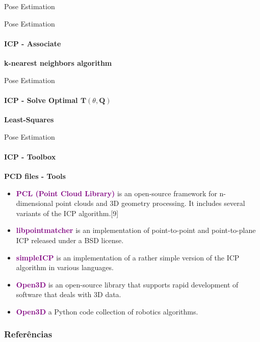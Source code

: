 \documentclass[aspectratio=169]{beamer}
\begin{document}
\begin{frame}[fragile, t]{Pose Estimation}
\begin{minipage}{0.4\textwidth}
\begin{figure}
{}
	\end{figure}
\end{minipage}
\end{frame}


\begin{frame}[fragile, t]{Pose Estimation}
	\framesubtitle{ICP - Associate}

	\textbf{k-nearest neighbors algorithm}

\end{frame}


\begin{frame}[fragile, t]{Pose Estimation}
	\framesubtitle{ICP - Solve Optimal $\mathbf{T}(\theta, \mathbf{Q})$}

	\textbf{Least-Squares}

\end{frame}

\begin{frame}[fragile, t]{Pose Estimation}
	\framesubtitle{ICP - Toolbox}

	
	\textbf{PCD files - Tools}
	\begin{itemize}
		\item \textcolor{purple}{\textbf{PCL (Point Cloud Library)}} is an open-source framework for n-dimensional point clouds and 3D geometry processing. It includes several variants of the ICP algorithm.[9]
		\item \textcolor{purple}{\textbf{libpointmatcher}} is an implementation of point-to-point and point-to-plane ICP released under a BSD license.
		\item \textcolor{purple}{\textbf{simpleICP}} is an implementation of a rather simple version of the ICP algorithm in various languages.
		\item \textcolor{purple}{\textbf{Open3D}} is an open-source library that supports rapid development of software that deals with 3D data. 
		\item \textcolor{purple}{\textbf{Open3D}} a Python code collection of robotics algorithms.
	\end{itemize}

\end{frame}


\begin{frame}[t, allowframebreaks]
	\frametitle{Referências}
	
\end{frame}
\end{document}
